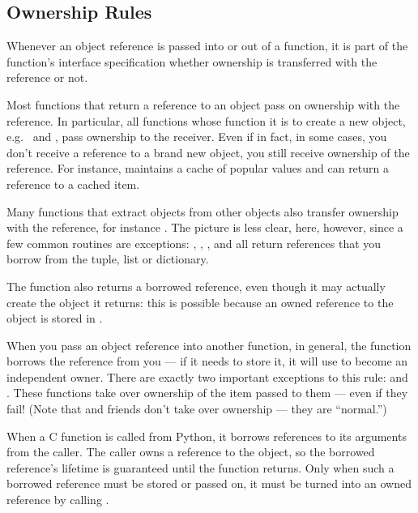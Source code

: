 \documentclass{manual}
\begin{document}
\subsection{Ownership Rules
            \label{ownershipRules}}

Whenever an object reference is passed into or out of a function, it
is part of the function's interface specification whether ownership is
transferred with the reference or not.

Most functions that return a reference to an object pass on ownership
with the reference.  In particular, all functions whose function it is
to create a new object, e.g.\  and
, pass ownership to the receiver.  Even if in
fact, in some cases, you don't receive a reference to a brand new
object, you still receive ownership of the reference.  For instance,
 maintains a cache of popular values and can
return a reference to a cached item.

Many functions that extract objects from other objects also transfer
ownership with the reference, for instance
.  The picture is less clear, here,
however, since a few common routines are exceptions:
, ,
, and 
all return references that you borrow from the tuple, list or
dictionary.

The function  also returns a borrowed
reference, even though it may actually create the object it returns:
this is possible because an owned reference to the object is stored in
.

When you pass an object reference into another function, in general,
the function borrows the reference from you --- if it needs to store
it, it will use  to become an independent
owner.  There are exactly two important exceptions to this rule:
 and .  These
functions take over ownership of the item passed to them --- even if
they fail!  (Note that  and friends don't
take over ownership --- they are ``normal.'')

When a C function is called from Python, it borrows references to its
arguments from the caller.  The caller owns a reference to the object,
so the borrowed reference's lifetime is guaranteed until the function
returns.  Only when such a borrowed reference must be stored or passed
on, it must be turned into an owned reference by calling
.
\end{document}
